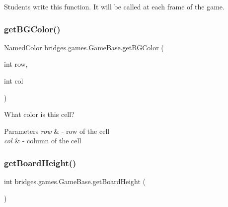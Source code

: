Students write this function. It will be called at each frame of the game. \mbox{\label{classbridges_1_1games_1_1_game_base_abe167e48f828be58d01ecb252afe6c7c}} 
\subsubsection{\texorpdfstring{get\+B\+G\+Color()}{getBGColor()}}
{\footnotesize\ttfamily \mbox{\hyperlink{enumbridges_1_1base_1_1_named_color}{Named\+Color}} bridges.\+games.\+Game\+Base.\+get\+B\+G\+Color (\begin{DoxyParamCaption}\item[{int}]{row,  }\item[{int}]{col }\end{DoxyParamCaption})\hspace{0.3cm}{\ttfamily [protected]}}



What color is this cell? 


\begin{DoxyParams}{Parameters}
{\em row} & -\/ row of the cell \\
\hline
{\em col} & -\/ column of the cell \\
\hline
\end{DoxyParams}
\mbox{\label{classbridges_1_1games_1_1_game_base_a1effb2a789eb19eb81dec64f25be233e}} 
\subsubsection{\texorpdfstring{get\+Board\+Height()}{getBoardHeight()}}
{\footnotesize\ttfamily int bridges.\+games.\+Game\+Base.\+get\+Board\+Height (\begin{DoxyParamCaption}{ }\end{DoxyParamCaption})\hspace{0.3cm}{\ttfamily [protected]}}



